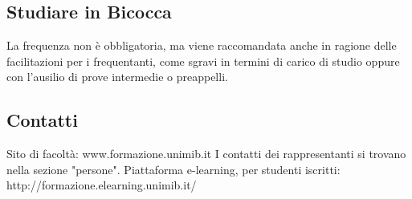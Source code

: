 \subsection{Studiare in Bicocca}
La frequenza non è obbligatoria, ma viene raccomandata anche in ragione delle facilitazioni per i frequentanti, come sgravi in termini di carico di studio oppure con l'ausilio di prove intermedie o preappelli. 

\subsection{Contatti}
Sito di facoltà: www.formazione.unimib.it 
I contatti dei rappresentanti si trovano nella sezione "persone". 
Piattaforma e-learning, per studenti iscritti: http://formazione.elearning.unimib.it/ 
